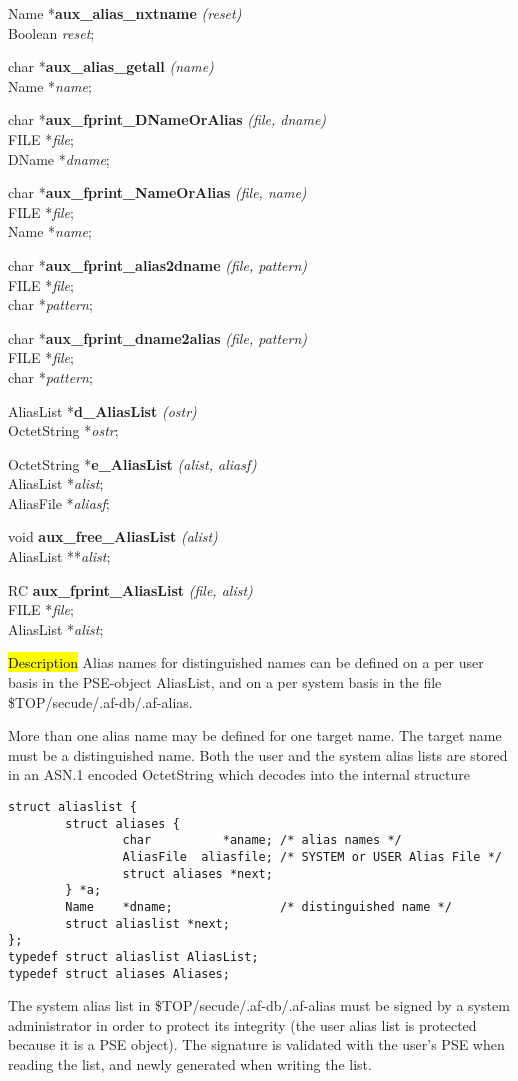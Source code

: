 Name *{\bf aux\_alias\_nxtname} {\em (reset)} \\
Boolean {\em reset};

char *{\bf aux\_alias\_getall} {\em (name)} \\
Name *{\em name};

char *{\bf aux\_fprint\_DNameOrAlias} {\em (file, dname)} \\
FILE *{\em file}; \\
DName *{\em dname}; 

char *{\bf aux\_fprint\_NameOrAlias} {\em (file, name)} \\
FILE *{\em file}; \\
Name *{\em name}; 

char *{\bf aux\_fprint\_alias2dname} {\em (file, pattern)} \\
FILE *{\em file}; \\
char *{\em pattern}; 

char *{\bf aux\_fprint\_dname2alias} {\em (file, pattern)} \\
FILE *{\em file}; \\
char *{\em pattern};

AliasList *{\bf d\_AliasList} {\em (ostr)} \\
OctetString *{\em ostr};

OctetString *{\bf e\_AliasList} {\em (alist, aliasf)} \\
AliasList *{\em alist}; \\
AliasFile *{\em aliasf};

void {\bf aux\_free\_AliasList} {\em (alist)} \\
AliasList **{\em alist};

RC {\bf aux\_fprint\_AliasList} {\em (file, alist)} \\
FILE *{\em file}; \\
AliasList *{\em alist};

\hl{Description}
Alias names for distinguished names can be defined on a per user basis in the PSE-object
AliasList, and on a per system basis in the file \$TOP/secude/.af-db/.af-alias.


More than one alias name may be defined for one target name. The target name must be a
distinguished name. Both the user and the system alias lists are stored
in an ASN.1 encoded OctetString which decodes into the internal structure
\begin{verbatim}
struct aliaslist {
        struct aliases {
                char          *aname; /* alias names */
                AliasFile  aliasfile; /* SYSTEM or USER Alias File */
                struct aliases *next;
        } *a;
        Name    *dname;               /* distinguished name */
        struct aliaslist *next;
};
typedef struct aliaslist AliasList;
typedef struct aliases Aliases;
\end{verbatim}
The system alias list in \$TOP/secude/.af-db/.af-alias must be signed by a system
administrator in order to protect its integrity (the user alias list 
is protected because it is a PSE object).
The signature is validated with the user's PSE when reading the list, and newly generated when
writing the list.

